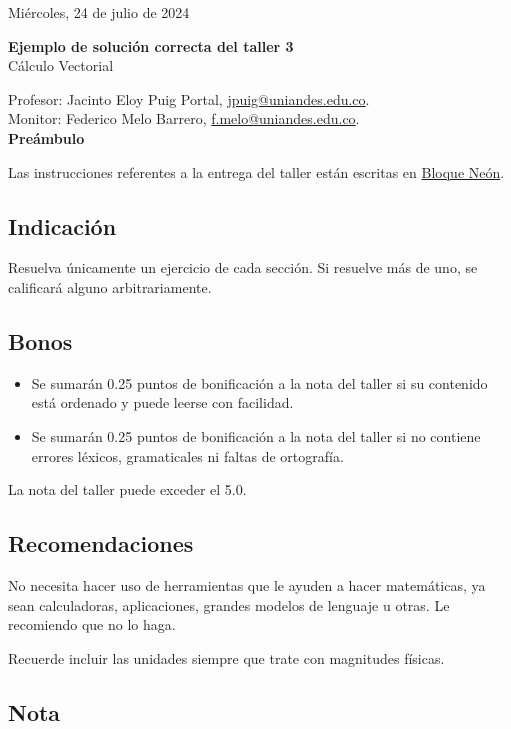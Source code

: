\documentclass{fmbvecto}
\renewcommand{\title}{Ejemplo de solución correcta del taller 3}
\newcommand{\subject}{Cálculo Vectorial}
\begin{document}
Miércoles, 24 de julio de 2024

\begin{center}
    \textbf{\LARGE \title} \\
    {\large \subject}
\end{center}


Profesor: Jacinto Eloy Puig Portal, \href{mailto:jpuig@uniandes.edu.co}{jpuig@uniandes.edu.co}. \\
Monitor: Federico Melo Barrero, \href{mailto:f.melo@uniandes.edu.co}{f.melo@uniandes.edu.co}.\\

\textbf{\Large Preámbulo}

Las instrucciones referentes a la entrega del taller están escritas en \href{https://bloqueneon.uniandes.edu.co/d2l/home}{Bloque Neón}.

\subsection*{Indicación}

Resuelva únicamente un ejercicio de cada sección. Si resuelve más de uno, se calificará alguno arbitrariamente.

\subsection*{Bonos}
\begin{itemize}
  \item Se sumarán 0.25 puntos de bonificación a la nota del taller si su contenido está ordenado y puede leerse con facilidad.
  \item Se sumarán 0.25 puntos de bonificación a la nota del taller si no contiene errores léxicos, gramaticales ni faltas de ortografía.
\end{itemize}
La nota del taller puede exceder el 5.0.

\subsection*{Recomendaciones}

No necesita hacer uso de herramientas que le ayuden a hacer matemáticas, ya sean calculadoras, aplicaciones, grandes modelos de lenguaje u otras. Le recomiendo que no lo haga.

Recuerde incluir las unidades siempre que trate con magnitudes físicas.

\subsection*{Nota}
\end{document}
